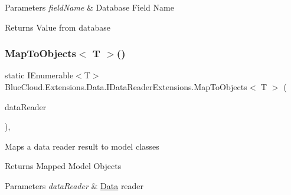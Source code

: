 \begin{DoxyParams}{Parameters}
{\em field\+Name} & Database Field Name\\
\hline
\end{DoxyParams}
\begin{DoxyReturn}{Returns}
Value from database
\end{DoxyReturn}
\mbox{\label{class_blue_cloud_1_1_extensions_1_1_data_1_1_i_data_reader_extensions_a96d6babf950003a62ab3dab97d868c53}} 
\subsubsection{\texorpdfstring{Map\+To\+Objects$<$ T $>$()}{MapToObjects< T >()}\hspace{0.1cm}{\footnotesize\ttfamily [1/2]}}
{\footnotesize\ttfamily static I\+Enumerable$<$T$>$ Blue\+Cloud.\+Extensions.\+Data.\+I\+Data\+Reader\+Extensions.\+Map\+To\+Objects$<$ T $>$ (\begin{DoxyParamCaption}\item[{this I\+Data\+Reader}]{data\+Reader }\end{DoxyParamCaption})\hspace{0.3cm}{\ttfamily [inline]}, {\ttfamily [static]}}



Maps a data reader result to model classes 

\begin{DoxyReturn}{Returns}
Mapped Model Objects
\end{DoxyReturn}

\begin{DoxyParams}{Parameters}
{\em data\+Reader} & \mbox{\hyperlink{namespace_blue_cloud_1_1_extensions_1_1_data}{Data}} reader\\
\hline
\end{DoxyParams}

